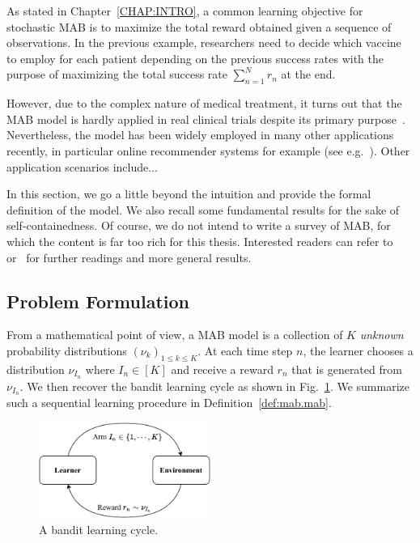 As stated in Chapter~\ref{CHAP:INTRO}, a common learning objective for stochastic MAB is to maximize the total reward obtained given a sequence of observations. In the previous example, researchers need to decide which vaccine to employ for each patient depending on the previous success rates with the purpose of maximizing the total success rate $\sum_{n=1}^N r_n$ at the end.

However, due to the complex nature of medical treatment, it turns out that the MAB model is hardly applied in real clinical trials despite its primary purpose~\citep{reda2020drug}. Nevertheless, the model has been widely employed in many other applications recently, in particular online recommender systems for example (see e.g.~\citealt{li2010contextual,zeng2016online}). Other application scenarios include...

In this section, we go a little beyond the intuition and provide the formal definition of the model. We also recall some fundamental results for the sake of self-containedness. Of course, we do not intend to write a survey of MAB, for which the content is far too rich for this thesis. Interested readers can refer to~\cite{bubeck2012bandits,lattimore2018bandits} or~\cite{slivkins2019bandits} for further readings and more general results.

\subsection{Problem Formulation}\label{sec:mab.model.formulation}

From a mathematical point of view, a MAB model is a collection of $K$ \emph{unknown} probability distributions $(\nu_k)_{1 \leq k \leq K}$. At each time step $n$, the learner chooses a distribution $\nu_{I_n}$ where $I_n\in[K]$ and receive a reward $r_n$ that is generated from $\nu_{I_n}$. We then recover the bandit learning cycle as shown in Fig.~\ref{fig:mab.mab}. We summarize such a sequential learning procedure in Definition~\ref{def:mab.mab}.

\begin{figure}[ht]
    \centering
    \includegraphics[width=0.5\textwidth]{Chapter2/img/mab_bis.pdf}
    \caption{A bandit learning cycle.}
    \label{fig:mab.mab}
\end{figure}

